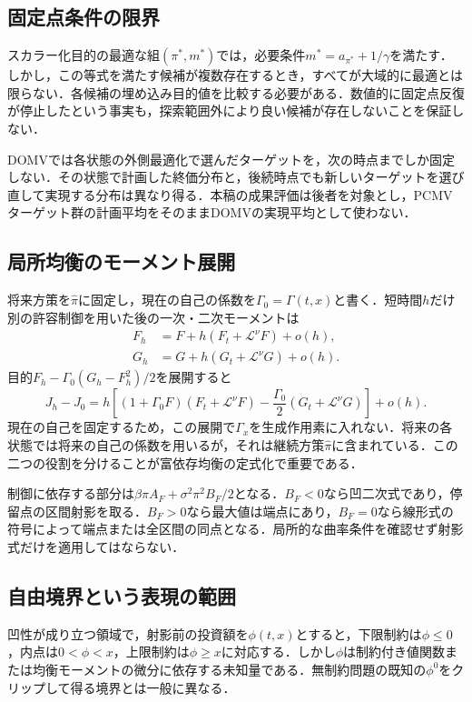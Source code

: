 \documentclass[11pt,a4paper]{article}
\numberwithin{equation}{section}
\numberwithin{table}{section}
\numberwithin{figure}{section}
\theoremstyle{plain}
\theoremstyle{definition}
\begin{document}
\subsection{固定点条件の限界}
スカラー化目的の最適な組$(\pi^*,m^*)$では，必要条件$m^*=a_{\pi^*}+1/\gamma$を満たす．しかし，この等式を満たす候補が複数存在するとき，すべてが大域的に最適とは限らない．各候補の埋め込み目的値を比較する必要がある．数値的に固定点反復が停止したという事実も，探索範囲外により良い候補が存在しないことを保証しない．

DOMVでは各状態の外側最適化で選んだターゲットを，次の時点までしか固定しない．その状態で計画した終価分布と，後続時点でも新しいターゲットを選び直して実現する分布は異なり得る．本稿の成果評価は後者を対象とし，PCMVターゲット群の計画平均をそのままDOMVの実現平均として使わない．

\subsection{局所均衡のモーメント展開}
将来方策を$\hat\pi$に固定し，現在の自己の係数を$\Gamma_0=\Gamma(t,x)$と書く．短時間$h$だけ別の許容制御を用いた後の一次・二次モーメントは
\begin{align}
F_h&=F+h(F_t+\mathcal L^\nu F)+o(h),\\
G_h&=G+h(G_t+\mathcal L^\nu G)+o(h).
\end{align}
目的$F_h-\Gamma_0(G_h-F_h^2)/2$を展開すると
\begin{equation}
J_h-J_0=h\left[(1+\Gamma_0F)(F_t+\mathcal L^\nu F)
-\frac{\Gamma_0}{2}(G_t+\mathcal L^\nu G)\right]+o(h).
\end{equation}
現在の自己を固定するため，この展開で$\Gamma_x$を生成作用素に入れない．将来の各状態では将来の自己の係数を用いるが，それは継続方策$\hat\pi$に含まれている．この二つの役割を分けることが富依存均衡の定式化で重要である．

制御に依存する部分は$\beta\pi A_F+\sigma^2\pi^2B_F/2$となる．$B_F<0$なら凹二次式であり，停留点の区間射影を取る．$B_F>0$なら最大値は端点にあり，$B_F=0$なら線形式の符号によって端点または全区間の同点となる．局所的な曲率条件を確認せず射影式だけを適用してはならない．

\subsection{自由境界という表現の範囲}
凹性が成り立つ領域で，射影前の投資額を$\phi(t,x)$とすると，下限制約は$\phi\leq0$，内点は$0<\phi<x$，上限制約は$\phi\geq x$に対応する．しかし$\phi$は制約付き値関数または均衡モーメントの微分に依存する未知量である．無制約問題の既知の$\phi^0$をクリップして得る境界とは一般に異なる．
\end{document}
